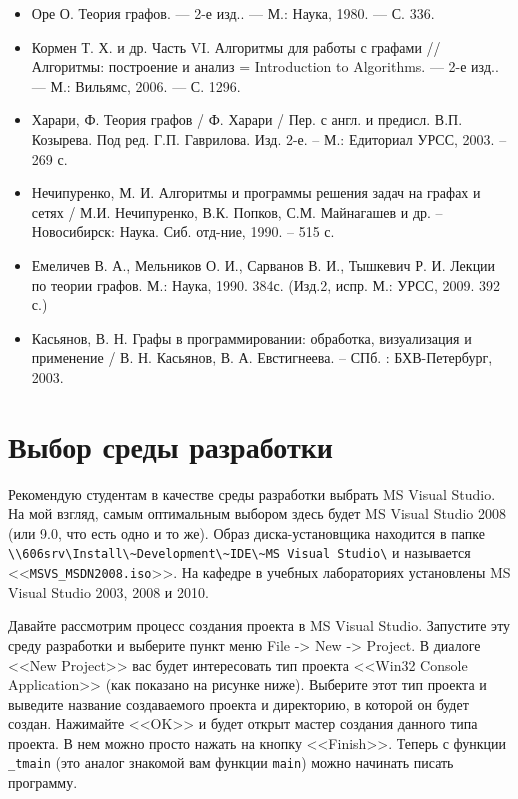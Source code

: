 \begin{itemize}
\item Оре О. Теория графов. — 2-е изд.. — М.: Наука, 1980. — С. 336.
\item Кормен Т. Х. и др. Часть VI. Алгоритмы для работы с графами //
  Алгоритмы: построение и анализ = Introduction to Algorithms. — 2-е
  изд.. — М.: Вильямс, 2006. — С. 1296.
\item Харари, Ф. Теория графов / Ф. Харари / Пер. с англ. и
  предисл. В.П. Козырева. Под ред. Г.П. Гаврилова. Изд. 2-е. – М.:
  Едиториал УРСС, 2003. – 269 с.
\item Нечипуренко, М. И. Алгоритмы и программы решения задач на графах
  и сетях / М.И. Нечипуренко, В.К. Попков, С.М. Майнагашев и др. –
  Новосибирск: Наука. Сиб. отд-ние, 1990. – 515 с.
\item Емеличев В. А., Мельников О. И., Сарванов В. И., Тышкевич
  Р. И. Лекции по теории графов. М.: Наука, 1990. 384с. (Изд.2,
  испр. М.: УРСС, 2009. 392 с.)
\item Касьянов, В. Н. Графы в программировании: обработка,
  визуализация и применение / В. Н. Касьянов, В. А. Евстигнеева. –
  СПб. : БХВ-Петербург, 2003.
\end{itemize}

\section{Выбор среды разработки}

Рекомендую студентам в качестве среды разработки выбрать MS Visual
Studio. На мой взгляд, самым оптимальным выбором здесь будет MS Visual
Studio 2008 (или 9.0, что есть одно и то же). Образ диска-установщика
находится в папке
\verb|\\606srv\Install\~Development\~IDE\~MS Visual Studio\| и
называется <<\verb|MSVS_MSDN2008.iso|>>. На кафедре в учебных
лабораториях установлены MS Visual Studio 2003, 2008 и 2010.

Давайте рассмотрим процесс создания проекта в MS Visual
Studio. Запустите эту среду разработки и выберите пункт меню File ->
New -> Project. В диалоге <<New Project>> вас будет интересовать тип
проекта <<Win32 Console Application>> (как показано на рисунке
ниже). Выберите этот тип проекта и выведите название создаваемого
проекта и директорию, в которой он будет создан. Нажимайте <<OK>> и
будет открыт мастер создания данного типа проекта. В нем можно просто
нажать на кнопку <<Finish>>. Теперь с функции \lstinline{_tmain} (это
аналог знакомой вам функции \lstinline{main}) можно начинать писать
программу.

